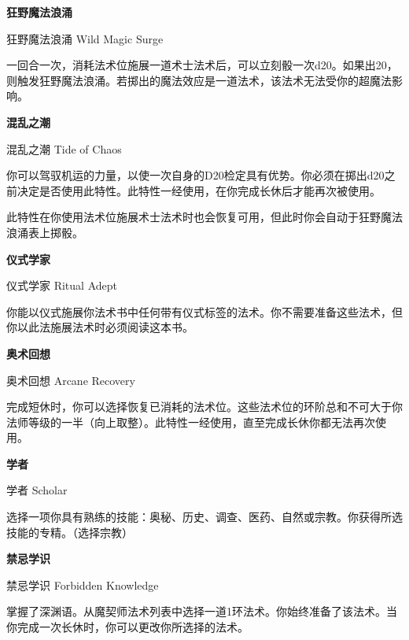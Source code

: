 \documentclass[letterpaper,openany,twoside,twocolumn]{book}
\begin{document}
\par\noindent\textbf{狂野魔法浪涌}\par
狂野魔法浪涌 Wild Magic Surge\par
一回合一次，消耗法术位施展一道术士法术后，可以立刻骰一次d20。如果出20，则触发狂野魔法浪涌。若掷出的魔法效应是一道法术，该法术无法受你的超魔法影响。\par


\par\noindent\textbf{混乱之潮}\par
混乱之潮 Tide of Chaos\par
你可以驾驭机运的力量，以使一次自身的D20检定具有优势。你必须在掷出d20之前决定是否使用此特性。此特性一经使用，在你完成长休后才能再次被使用。\par
此特性在你使用法术位施展术士法术时也会恢复可用，但此时你会自动于狂野魔法浪涌表上掷骰。\par


\par\noindent\textbf{仪式学家}\par
仪式学家 Ritual Adept\par
你能以仪式施展你法术书中任何带有仪式标签的法术。你不需要准备这些法术，但你以此法施展法术时必须阅读这本书。\par


\par\noindent\textbf{奥术回想}\par
奥术回想 Arcane Recovery\par
完成短休时，你可以选择恢复已消耗的法术位。这些法术位的环阶总和不可大于你法师等级的一半（向上取整）。此特性一经使用，直至完成长休你都无法再次使用。\par


\par\noindent\textbf{学者}\par
学者 Scholar\par
选择一项你具有熟练的技能：奥秘、历史、调查、医药、自然或宗教。你获得所选技能的专精。（选择宗教）\par


\par\noindent\textbf{禁忌学识}\par
禁忌学识 Forbidden Knowledge\par
掌握了深渊语。从魔契师法术列表中选择一道1环法术。你始终准备了该法术。当你完成一次长休时，你可以更改你所选择的法术。\par
\end{document}
